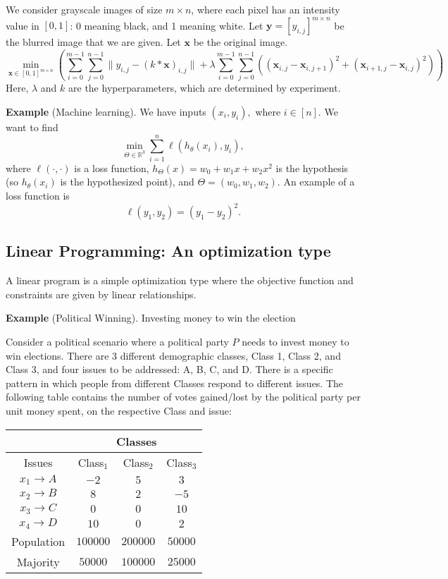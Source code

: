 \documentclass[twoside]{article}
\newcommand\R{\mathbb{R}}
\begin{document}
We consider grayscale images of size $m \times n$, where each pixel has an
intensity value in $[0, 1]$: 0 meaning black, and 1 meaning white.
Let $\mathbf{y} = [y_{i, j}]^{m \times n}$ be the blurred image that we are
given. Let $\mathbf{x}$ be the original image.
\[
    \min_{\mathbf{x} \in [0, 1]^{m \times n}}
    \left(
        \sum_{i = 0}^{m - 1} \sum_{j = 0}^{n - 1}
            \|y_{i, j} - (k * \mathbf{x})_{i, j}\|
        + \lambda \sum_{i = 0}^{m - 1} \sum_{j = 0}^{n - 1}
            ((\mathbf{x}_{i, j} - \mathbf{x}_{i, j + 1})^2
             + (\mathbf{x}_{i + 1, j} - \mathbf{x}_{i, j})^2)
    \right)
\] Here, $\lambda$ and $k$ are the hyperparameters, which are determined by
experiment.

\textbf{Example} (Machine learning). We have inputs $(x_i, y_i),$ where $i \in
[n].$ We want to find \[
    \min_{\Theta \in \R^3} \sum_{i = 1}^{n} \ell(h_\theta(x_i), y_i),
\] where $\ell(\cdot, \cdot)$ is a loss function, $h_\Theta(x) = w_0 + w_1 x +
w_2 x^2$ is the hypothesis (so $h_\theta(x_i)$ is the hypothesized point), and
$\Theta = (w_0, w_1, w_2)$. An example of a loss function is \[
    \ell(y_1, y_2) = (y_1 - y_2)^2.
\] 

\subsection{Linear Programming: An optimization type}
A linear program is a simple optimization type where the objective function and
constraints are given by linear relationships.

\textbf{Example} (Political Winning). Investing money to win the election

Consider a political scenario where a political party $P$ needs to invest money
to win elections. There are 3 different demographic classes, Class 1, Class 2,
and Class 3, and four issues to be addressed: A, B, C, and D. There is a
specific pattern in which people from different Classes respond to different
issues. The following table contains the number of votes gained/lost by the
political party per unit money spent, on the respective Class and issue:

\begin{table}[htbp]
  \centering
  \begin{tabular}{|c|c|c|c|}
    \hline
    \multicolumn{1}{|c|}{} & \multicolumn{3}{c|}{Classes} \\
    \hline
    Issues & Class$_1$ & Class$_2$ & Class$_3$  \\
    \hline
    $x_1 \rightarrow A $ & $-2$ & $5$ & $3$  \\
    \hline
    $x_2 \rightarrow B $ & $8$ & $2$ & $-5$  \\
    \hline
    $x_3 \rightarrow C $ & $0$ & $0$ & $10$  \\
    \hline
    $x_4 \rightarrow D $ & $10$ & $0$ & $2$ \\
    \hline
    Population & $100000$ & $200000$ & $50000$\\
    \hline
    Majority & $50000$ & $100000$ & $25000$\\
    \hline
  \end{tabular}
  \label{tab:election_grid}
\end{table}
\end{document}
